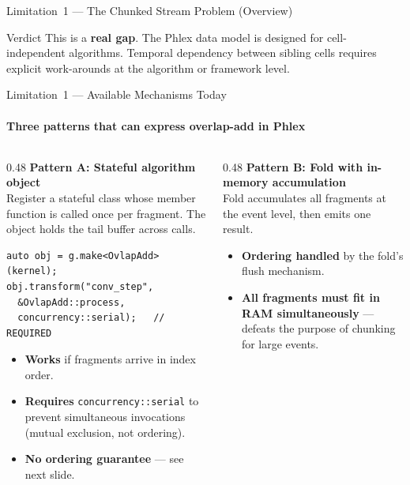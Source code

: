 \documentclass[aspectratio=169,10pt]{beamer}
\newcommand{\good}[1]{\textcolor{green!50!black}{\textbf{#1}}}
\newcommand{\bad}[1]{\textcolor{red!70!black}{\textbf{#1}}}
\newcommand{\warn}[1]{\textcolor{orange!80!black}{\textbf{#1}}}
\newcommand{\code}[1]{\texttt{\small #1}}
\begin{document}
\begin{frame}{Limitation~1 --- The Chunked Stream Problem (Overview)}
  \medskip
  \begin{alertblock}{Verdict}
    This is a \bad{real gap}.  The Phlex data model is designed for
    cell-independent algorithms.  Temporal dependency between sibling cells
    requires explicit work-arounds at the algorithm or framework level.
  \end{alertblock}
\end{frame}


\begin{frame}[fragile]{Limitation~1 --- Available Mechanisms Today}
  \framesubtitle{Three patterns that can express overlap-add in Phlex}

  \begin{columns}[T]
    \begin{column}{0.48\textwidth}
      \textbf{Pattern A: Stateful algorithm object} \\[2pt]
      \small
      Register a stateful class whose member function is called once per
      fragment.  The object holds the tail buffer across calls.
      \begin{lstlisting}
auto obj = g.make<OvlapAdd>(kernel);
obj.transform("conv_step",
  &OvlapAdd::process,
  concurrency::serial);   // REQUIRED
      \end{lstlisting}
      \begin{itemize}\tiny
        \item \good{Works} if fragments arrive in index order.
        \item \warn{Requires} \code{concurrency::serial} to prevent
              simultaneous invocations (mutual exclusion, not ordering).
        \item \bad{No ordering guarantee} --- see next slide.
      \end{itemize}
    \end{column}
    \begin{column}{0.48\textwidth}
      \textbf{Pattern B: Fold with in-memory accumulation} \\[2pt]
      \small
      Fold accumulates all fragments at the event level, then emits one
      result.
      \begin{itemize}\tiny
        \item \good{Ordering handled} by the fold's flush mechanism.
        \item \bad{All fragments must fit in RAM simultaneously} ---
              defeats the purpose of chunking for large events.
      \end{itemize}


\end{column}
\end{columns}
\end{frame}
\end{document}
